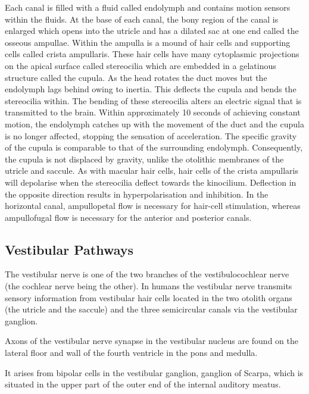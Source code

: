 \documentclass[]{book}
\begin{document}
Each canal is filled with a fluid called endolymph and contains motion sensors within the fluids. At the base of each canal, the bony region of the canal is enlarged which opens into the utricle and has a dilated sac at one end called the osseous ampullae. Within the ampulla is a mound of hair cells and supporting cells called crista ampullaris. These hair cells have many cytoplasmic projections on the apical surface called stereocilia which are embedded in a gelatinous structure called the cupula. As the head rotates the duct moves but the endolymph lags behind owing to inertia. This deflects the cupula and bends the stereocilia within. The bending of these stereocilia alters an electric signal that is transmitted to the brain. Within approximately 10 seconds of achieving constant motion, the endolymph catches up with the movement of the duct and the cupula is no longer affected, stopping the sensation of acceleration. The specific gravity of the cupula is comparable to that of the surrounding endolymph. Consequently, the cupula is not displaced by gravity, unlike the otolithic membranes of the utricle and saccule. As with macular hair cells, hair cells of the crista ampullaris will depolarise when the stereocilia deflect towards the kinocilium. Deflection in the opposite direction results in hyperpolarisation and inhibition. In the horizontal canal, ampullopetal flow is necessary for hair-cell stimulation, whereas ampullofugal flow is necessary for the anterior and posterior canals.

\hypertarget{vestibular-pathways}{%
\subsection{Vestibular Pathways}\label{vestibular-pathways}}

The vestibular nerve is one of the two branches of the vestibulocochlear nerve (the cochlear nerve being the other). In humans the vestibular nerve transmits sensory information from vestibular hair cells located in the two otolith organs (the utricle and the saccule) and the three semicircular canals via the vestibular ganglion.

Axons of the vestibular nerve synapse in the vestibular nucleus are found on the lateral floor and wall of the fourth ventricle in the pons and medulla.

It arises from bipolar cells in the vestibular ganglion, ganglion of Scarpa, which is situated in the upper part of the outer end of the internal auditory meatus.
\end{document}

